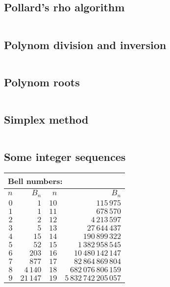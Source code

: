 \documentclass{article}
\begin{document}
\subsection{Pollard's rho algorithm}
\inputminted[mathescape, breaklines, breakafter=(, tabsize=2, frame=lines, showtabs, tab=|\ , tabcolor=lightgray]{c++}{./numeric/pollard/pollard.cpp}
\subsection{Polynom division and inversion}
\inputminted[mathescape, breaklines, breakafter=(, tabsize=2, frame=lines, showtabs, tab=|\ , tabcolor=lightgray]{c++}{./numeric/polynom-division/polynom-division.cpp}
\subsection{Polynom roots}
\inputminted[mathescape, breaklines, breakafter=(, tabsize=2, frame=lines, showtabs, tab=|\ , tabcolor=lightgray]{c++}{./numeric/polynom-roots/polynom-roots.cpp}
\subsection{Simplex method}
\inputminted[mathescape, breaklines, breakafter=(, tabsize=2, frame=lines, showtabs, tab=|\ , tabcolor=lightgray]{c++}{./numeric/simplex/simplex.cpp}
\subsection{Some integer sequences}
\begin{center}
\begin{tabular}{|r|r|r|r|}
\hline
\multicolumn{4}{|l|}{Bell numbers:} \\
\hline
$n$ & $B_n$ & $n$ & $B_n$ \\
\hline
$0$ & $1$ & $10$ & $115\,975$ \\
\hline
$1$ & $1$ & $11$ & $678\,570$ \\
\hline
$2$ & $2$ & $12$ & $4\,213\,597$ \\
\hline
$3$ & $5$ & $13$ & $27\,644\,437$ \\
\hline
$4$ & $15$ & $14$ & $190\,899\,322$ \\
\hline
$5$ & $52$ & $15$ & $1\,382\,958\,545$ \\
\hline
$6$ & $203$ & $16$ & $10\,480\,142\,147$ \\
\hline
$7$ & $877$ & $17$ & $82\,864\,869\,804$ \\
\hline
$8$ & $4\,140$ & $18$ & $682\,076\,806\,159$ \\
\hline
$9$ & $21\,147$ & $19$ & $5\,832\,742\,205\,057$\\
\hline
\end{tabular}
\end{center}
\end{document}
